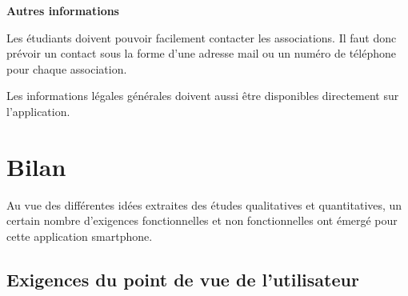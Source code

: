 \documentclass[a4paper, 11px]{article}
\begin{document}
\vspace{.3cm}

 \textbf {\large Autres informations}

Les étudiants doivent pouvoir facilement contacter les associations. Il faut donc prévoir un contact sous la forme d'une adresse mail ou un numéro de téléphone pour chaque association.

Les informations légales générales doivent aussi être disponibles directement sur l'application.
\vspace{.3cm}

\newpage

\section{Bilan}
Au vue des différentes idées extraites des études qualitatives et quantitatives, un certain nombre d'exigences fonctionnelles et non fonctionnelles ont émergé pour cette application smartphone.
\subsection{Exigences du point de vue de l'utilisateur}
\end{document}
